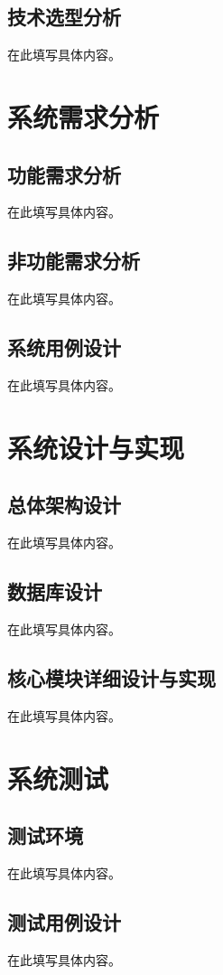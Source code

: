 \documentclass[a4paper,12pt,oneside]{ctexart}
\begin{document}
\subsection{技术选型分析}
在此填写具体内容。


\section{系统需求分析}
\subsection{功能需求分析}
在此填写具体内容。

\subsection{非功能需求分析}
在此填写具体内容。

\subsection{系统用例设计}
在此填写具体内容。


\section{系统设计与实现}
\subsection{总体架构设计}
在此填写具体内容。

\subsection{数据库设计}
在此填写具体内容。

\subsection{核心模块详细设计与实现}
在此填写具体内容。


\section{系统测试}
\subsection{测试环境}
在此填写具体内容。

\subsection{测试用例设计}
在此填写具体内容。
\end{document}
